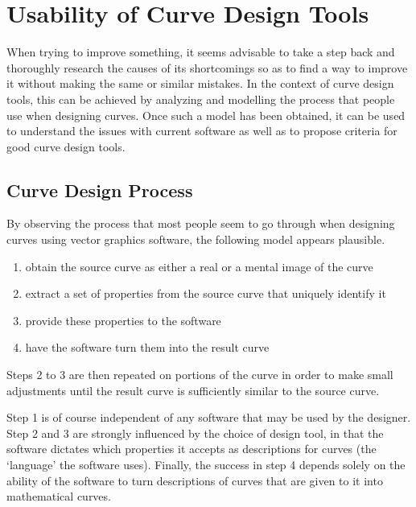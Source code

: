 \documentclass[a4paper]{article}
\begin{document}

	\section{Usability of Curve Design Tools}

		When trying to improve something, it seems advisable to take a step back and thoroughly research the causes of its shortcomings so as to find a way to improve it without making the same or similar mistakes. In the context of curve design tools, this can be achieved by analyzing and modelling the process that people use when designing curves. Once such a model has been obtained, it can be used to understand the issues with current software as well as to propose criteria for good curve design tools.

		\subsection{Curve Design Process}

			By observing the process that most people seem to go through when designing curves using vector graphics software, the following model appears plausible.

			\begin{enumerate}
				\item obtain the source curve as either a real or a mental image of the curve
				\item extract a set of properties from the source curve that uniquely identify it
				\item provide these properties to the software
				\item have the software turn them into the result curve
			\end{enumerate}

			Steps 2 to 3 are then repeated on portions of the curve in order to make small adjustments until the result curve is sufficiently similar to the source curve.

			Step 1 is of course independent of any software that may be used by the designer. Step 2 and 3 are strongly influenced by the choice of design tool, in that the software dictates which properties it accepts as descriptions for curves (the `language' the software uses). Finally, the success in step 4 depends solely on the ability of the software to turn descriptions of curves that are given to it into mathematical curves.
\end{document}
